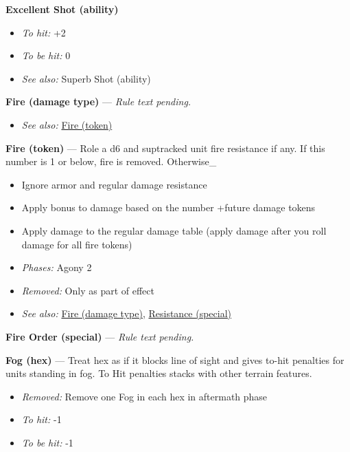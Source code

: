 \documentclass[a4paper,12pt]{article}
\begin{document}
\label{rule-ability-excellent-shot}%
\noindent\textbf{Excellent Shot (ability)}\begin{itemize}
\item \textit{To hit:} +2
\item \textit{To be hit:} 0
\item \textit{See also:} Superb Shot (ability)
\end{itemize}


\label{rule-damage-type-fire}%
\noindent\textbf{Fire (damage type)} --- \textit{Rule text pending.}\begin{itemize}
\item \textit{See also:} \hyperref[rule-token-fire]{Fire (token)}
\end{itemize}


\label{rule-token-fire}%
\noindent\textbf{Fire (token)} --- Role a d6 and suptracked unit fire resistance if any. If this number is 1 or below, fire is removed. Otherwise\_
\begin{itemize}
\item Ignore armor and regular damage resistance
\item Apply bonus to damage based on the number +future damage tokens
\item Apply damage to the regular damage table  (apply damage after you roll damage for all fire tokens)
\end{itemize}
\begin{itemize}
\item \textit{Phases:} Agony 2
\item \textit{Removed:} Only as part of effect
\item \textit{See also:} \hyperref[rule-damage-type-fire]{Fire (damage type)}, \hyperref[rule-special-resistance]{Resistance (special)}
\end{itemize}


\label{rule-special-fire-order}%
\noindent\textbf{Fire Order (special)} --- \textit{Rule text pending.}

\label{rule-hex-fog}%
\noindent\textbf{Fog (hex)} --- Treat hex as if it blocks line of sight and gives to-hit penalties for units standing in fog. To Hit penalties stacks with other terrain features.
\begin{itemize}
\item \textit{Removed:} Remove one Fog in each hex in aftermath phase
\item \textit{To hit:} -1
\item \textit{To be hit:} -1
\end{itemize}
\end{document}
